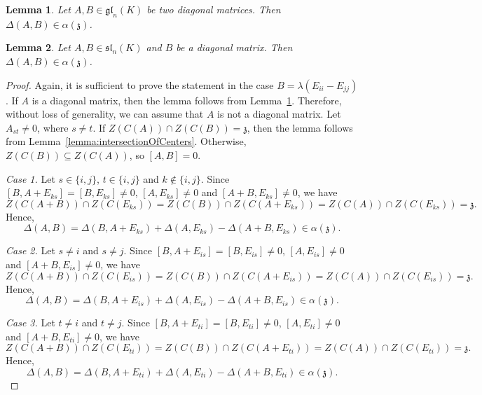 \documentclass[10pt,a4paper]{amsart}
\newtheorem{lemma}{Lemma}
\def\gl{\mathfrak{gl}}
\def\sl{\mathfrak{sl}}
\def\zzz{\mathfrak{z}}
\begin{document}
	\begin{lemma}\label{lemma:additivityForBothDiag}
		Let $A, B \in \gl_n(K)$ be two diagonal matrices. Then $\Delta(A, B) \in \alpha(\zzz)$.
	\end{lemma}

	\begin{lemma}\label{lemma:almostAdditivityForDiagInSl}
		Let $A, B \in \sl_n(K)$ and $B$ be a diagonal matrix. Then $\Delta(A, B) \in \alpha(\zzz)$.
	\end{lemma}

	\begin{proof}
		Again, it is sufficient to prove the statement in the case $B = \lambda (E_{ii} - E_{jj})$. If $A$ is a diagonal matrix, then the lemma follows from Lemma~\ref{lemma:additivityForBothDiag}. Therefore, without loss of generality, we can assume that $A$ is not a diagonal matrix. Let $A_{st} \neq 0$, where $s \neq t$. If $Z(C(A)) \cap Z(C(B)) = \zzz$, then the lemma follows from Lemma~\ref{lemma:intersectionOfCenters}. Otherwise, $Z(C(B)) \subseteq Z(C(A))$, so $[A, B] = 0$.

		\textit{Case 1.} Let $s \in \lbrace i, j \rbrace$, $t \in \lbrace i, j \rbrace$ and $k \not\in \lbrace i, j \rbrace$. Since $[B, A + E_{ks}] = [B, E_{ks}] \neq 0$, $[A, E_{ks}] \neq 0$ and $[A + B, E_{ks}] \neq 0$, we have
		\begin{equation*}
			Z(C(A + B)) \cap Z(C(E_{ks})) = Z(C(B)) \cap Z(C(A + E_{ks})) = Z(C(A)) \cap Z(C(E_{ks})) = \zzz.
		\end{equation*}
		Hence,
		\begin{equation*}
			\Delta(A, B) = \Delta(B, A + E_{ks}) + \Delta(A, E_{ks}) - \Delta(A + B, E_{ks}) \in \alpha(\zzz).
		\end{equation*}

		\textit{Case 2.} Let $s \neq i$ and $s \neq j$. Since $[B, A + E_{is}] = [B, E_{is}] \neq 0$, $[A, E_{is}] \neq 0$ and $[A + B, E_{is}] \neq 0$, we have
		\begin{equation*}
			Z(C(A + B)) \cap Z(C(E_{is})) = Z(C(B)) \cap Z(C(A + E_{is})) = Z(C(A)) \cap Z(C(E_{is})) = \zzz.
		\end{equation*}
		Hence,
		\begin{equation*}
			\Delta(A, B) = \Delta(B, A + E_{is}) + \Delta(A, E_{is}) - \Delta(A + B, E_{is}) \in \alpha(\zzz).
		\end{equation*}
		
		\textit{Case 3.} Let $t \neq i$ and $t \neq j$. Since $[B, A + E_{ti}] = [B, E_{ti}] \neq 0$, $[A, E_{ti}] \neq 0$ and $[A + B, E_{ti}] \neq 0$, we have
		\begin{equation*}
			Z(C(A + B)) \cap Z(C(E_{ti})) = Z(C(B)) \cap Z(C(A + E_{ti})) = Z(C(A)) \cap Z(C(E_{ti})) = \zzz.
		\end{equation*}
		Hence,
		\begin{equation*}
			\Delta(A, B) = \Delta(B, A + E_{ti}) + \Delta(A, E_{ti}) - \Delta(A + B, E_{ti}) \in \alpha(\zzz).
		\end{equation*}
	\end{proof}
\end{document}

